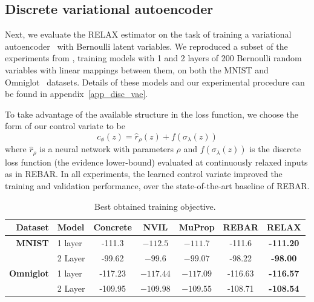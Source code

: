 \documentclass{article}
\newcommand{\relaxed}{r}
\newcommand{\RELAX}{{\textnormal{RELAX}}}
\begin{document}
\vspace{3em}
\subsection{Discrete variational autoencoder}
Next, we evaluate the \RELAX{} estimator on the task of training a variational autoencoder~\citep{kingma2013autoencoding, rezende2014stochastic} with Bernoulli latent variables.
We reproduced a subset of the experiments from \citet{tucker2017rebar}, training models with 1 and 2 layers of 200 Bernoulli random variables with linear mappings between them, on both  the MNIST and Omniglot~\citep{lake2015human} datasets.
Details of these models and our experimental procedure can be found in appendix~\ref{app_disc_vae}.


To take advantage of the available structure in the loss function, we choose the form of our control variate to be $$ c_\phi(z) = \hat{r}_\rho(z) + f(\sigma_\lambda(z))$$ where $\hat{r}_\rho$ is a neural network with parameters $\rho$ and $f(\sigma_\lambda(z))$ is the discrete loss function (the evidence lower-bound) evaluated at continuously relaxed inputs as in REBAR.  
%
In all experiments, the learned control variate improved the training and validation performance, over the state-of-the-art baseline of REBAR. 

\begin{table}[h]
\centering
\begin{tabular}{r l | c c c c c} 
Dataset & Model & Concrete & NVIL & MuProp  & REBAR & RELAX\\\midrule
\textbf{MNIST} & 1 layer  &-111.3 & $-112.5$ & $-111.7$  & -111.6 & \textbf{-111.20} \\ 
               & 2 Layer  &-99.62 & $-99.6$ & $-99.07$   & -98.22 & \textbf{-98.00} \\
\midrule
\textbf{Omniglot} & 1 layer &-117.23 & $-117.44$ & $-117.09$   & -116.63 & \textbf{-116.57} \\ 
                  & 2 Layer &-109.95 & $-109.98$ & $-109.55$  & -108.71 & \textbf{-108.54}
\end{tabular}
\caption{Best obtained training objective.}
\label{tab:vae tr}
\end{table}
\end{document}
